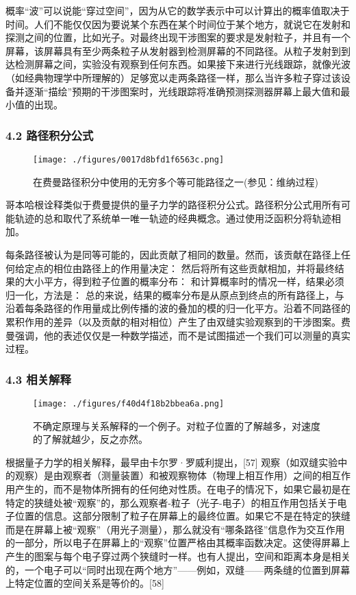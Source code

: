 概率“波”可以说能“穿过空间”，因为从它的数学表示中可以计算出的概率值取决于时间。人们不能仅仅因为要说某个东西在某个时间位于某个地方，就说它在发射和探测之间的位置，比如光子。对最终出现干涉图案的要求是发射粒子，并且有一个屏幕，该屏幕具有至少两条粒子从发射器到检测屏幕的不同路径。从粒子发射到到达检测屏幕之间，实验没有观察到任何东西。如果接下来进行光线跟踪，就像光波（如经典物理学中所理解的）足够宽以走两条路径一样，那么当许多粒子穿过该设备并逐渐“描绘”预期的干涉图案时，光线跟踪将准确预测探测器屏幕上最大值和最小值的出现。
\subsubsection{4.2 路径积分公式}
\begin{figure}[ht]
\centering
\texttt{[image: ./figures/0017d8bfd1f6563c.png]}
\caption{在费曼路径积分中使用的无穷多个等可能路径之一(参见：维纳过程)} \label{fig_SFSY_8}
\end{figure}
哥本哈根诠释类似于费曼提供的量子力学的路径积分公式。路径积分公式用所有可能轨迹的总和取代了系统单一唯一轨迹的经典概念。通过使用泛函积分将轨迹相加。

每条路径被认为是同等可能的，因此贡献了相同的数量。然而，该贡献在路径上任何给定点的相位由路径上的作用量决定：
然后将所有这些贡献相加，并将最终结果的大小平方，得到粒子位置的概率分布：
和计算概率时的情况一样，结果必须归一化，方法是：
总的来说，结果的概率分布是从原点到终点的所有路径上，与沿着每条路径的作用量成比例传播的波的叠加的模的归一化平方。沿着不同路径的累积作用的差异（以及贡献的相对相位）产生了由双缝实验观察到的干涉图案。费曼强调，他的表述仅仅是一种数学描述，而不是试图描述一个我们可以测量的真实过程。
\subsubsection{4.3 相关解释}
\begin{figure}[ht]
\centering
\texttt{[image: ./figures/f40d4f18b2bbea6a.png]}
\caption{不确定原理与关系解释的一个例子。对粒子位置的了解越多，对速度的了解就越少，反之亦然。} \label{fig_SFSY_9}
\end{figure}
根据量子力学的相关解释，最早由卡尔罗·罗威利提出，[57] 观察（如双缝实验中的观察）是由观察者（测量装置）和被观察物体（物理上相互作用）之间的相互作用产生的，而不是物体所拥有的任何绝对性质。在电子的情况下，如果它最初是在特定的狭缝处被“观察”的，那么观察者-粒子（光子-电子）的相互作用包括关于电子位置的信息。这部分限制了粒子在屏幕上的最终位置。如果它不是在特定的狭缝而是在屏幕上被“观察”（用光子测量），那么就没有“哪条路径”信息作为交互作用的一部分，所以电子在屏幕上的“观察”位置严格由其概率函数决定。这使得屏幕上产生的图案与每个电子穿过两个狭缝时一样。也有人提出，空间和距离本身是相关的，一个电子可以“同时出现在两个地方”——例如，双缝——两条缝的位置到屏幕上特定位置的空间关系是等价的。[58]
